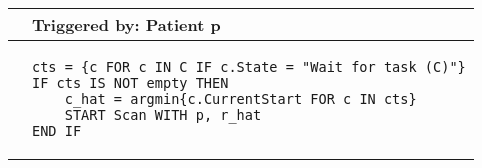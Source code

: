 \begin{tabular}{@{}>{\raggedright\arraybackslash}p{0.25cm}>{\raggedright\arraybackslash}p{13cm}@{}}
  \toprule
   & Triggered by: Patient p\\ \midrule 
  &
\vspace{-12pt}
\begin{lstlisting}[language=CMPseudo]
cts = {c FOR c IN C IF c.State = "Wait for task (C)"}
IF cts IS NOT empty THEN 
    c_hat = argmin{c.CurrentStart FOR c IN cts}
    START Scan WITH p, r_hat
END IF
  \end{lstlisting}
  \\ \bottomrule
  \end{tabular}